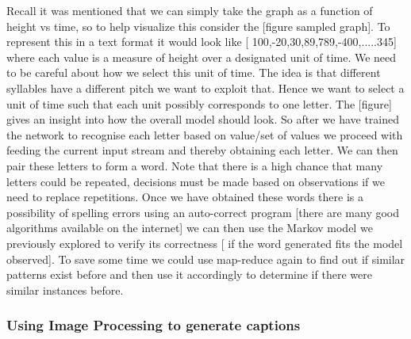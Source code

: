 \documentclass[sigconf]{acmart}
\begin{document}
Recall it was mentioned that we can simply take the graph as a function of height vs time, so to help visualize this consider the [figure sampled graph]. To represent this in a text format it would look like [ 100,-20,30,89,789,-400,.....345] where each value is a measure of height over a designated unit of time. We need to be careful about how we select this unit of time. The idea is that different syllables have a different pitch we want to exploit that. Hence we want to select a unit of time such that each unit possibly corresponds to one letter. The [figure] gives an insight into how the overall model should look. So after we have trained the network to recognise each letter based on value/set of values we proceed with feeding the current input stream and thereby obtaining each letter. We can then pair these letters to form a word. Note that there is a high chance that many letters could be repeated, decisions must be made based on observations if we need to replace repetitions. Once we have obtained these words there is a possibility of spelling errors using an auto-correct program [there are many good algorithms available on the internet] we can then use the Markov model we previously explored to verify its correctness [ if the word generated fits the model observed]. To save some time we could use map-reduce again to find out if similar patterns exist before and then use it accordingly to determine if there were similar instances before.

\subsubsection{Using Image Processing to generate captions}
\end{document}
